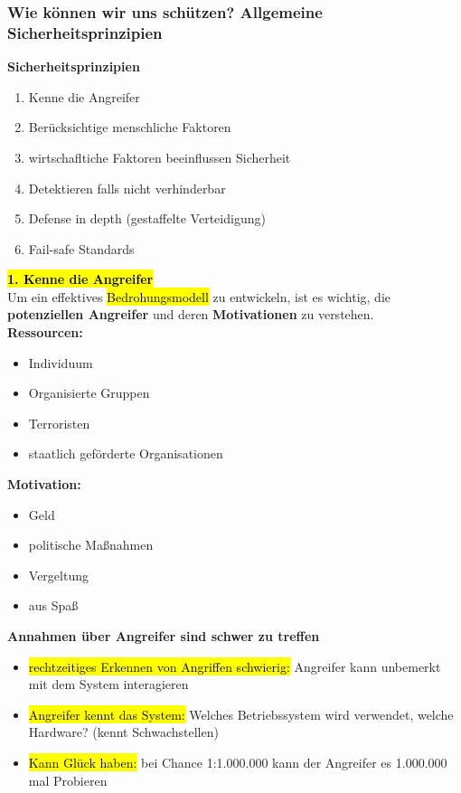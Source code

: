 \documentclass[a4paper, 10pt]{article}
\begin{document}
\subsubsection{Wie können wir uns schützen? Allgemeine Sicherheitsprinzipien}
\textbf{Sicherheitsprinzipien}
\begin{enumerate}
    \item Kenne die Angreifer
    \item Berücksichtige menschliche Faktoren
    \item wirtschafltiche Faktoren beeinflussen Sicherheit 
    \item Detektieren falls nicht verhinderbar
    \item Defense in depth (gestaffelte Verteidigung)
    \item Fail-safe Standards
\end{enumerate}
\hl{\textbf{1. Kenne die Angreifer}}\\[2mm]
Um ein effektives \hl{Bedrohungsmodell} zu entwickeln, ist es wichtig, die \textbf{potenziellen Angreifer} und deren \textbf{Motivationen} zu verstehen.\\[3mm]
\textbf{Ressourcen:}
\begin{itemize}
    \item Individuum
    \item Organisierte Gruppen
    \item Terroristen
    \item staatlich geförderte Organisationen
\end{itemize}
\textbf{Motivation:}
\begin{itemize}
    \item Geld
    \item politische Maßnahmen
    \item Vergeltung
    \item aus Spaß
\end{itemize}
\textbf{Annahmen über Angreifer sind schwer zu treffen}
\begin{itemize}
    \item \hl{rechtzeitiges Erkennen von Angriffen schwierig:} Angreifer kann unbemerkt mit dem System interagieren
    \item \hl{Angreifer kennt das System:} Welches Betriebssystem wird verwendet, welche Hardware? (kennt Schwachstellen)
    \item  \hl{Kann Glück haben:} bei Chance 1:1.000.000 kann der Angreifer es 1.000.000 mal Probieren
\end{itemize}
\end{document}
